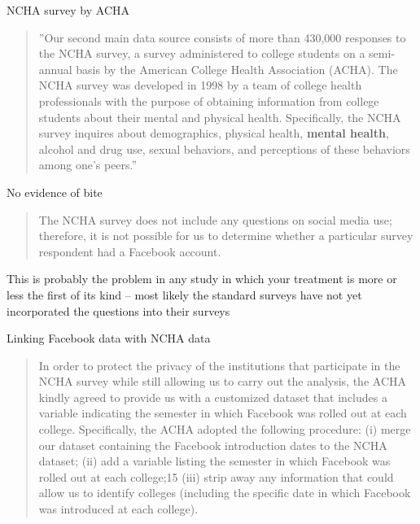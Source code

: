 \documentclass{beamer}
\begin{document}
\begin{frame}{NCHA survey by ACHA}

\begin{quote}
''Our second main data source consists of more than 430,000 responses to the NCHA survey, a survey administered to college students on a semi-annual basis by the American College Health Association (ACHA). The NCHA survey was developed in 1998 by a team of college health professionals with the purpose of obtaining information from college students about their mental and physical health. Specifically, the NCHA survey inquires about demographics, physical health, \textbf{mental health}, alcohol and drug use, sexual behaviors, and perceptions of these behaviors among one’s peers.''
\end{quote}

\end{frame}

\begin{frame}{No evidence of bite}

\begin{quote}
The NCHA survey does not include any questions on social media use; therefore, it is not possible for us to determine whether a particular survey respondent had a Facebook account.
\end{quote}

\bigskip

This is probably the problem in any study in which your treatment is more or less the first of its kind -- most likely the standard surveys have not yet incorporated the questions into their surveys

\end{frame}

\begin{frame}{Linking Facebook data with NCHA data}

\begin{quote}
In order to protect the privacy of the institutions that participate in the NCHA survey while still allowing us to carry out the analysis, the ACHA kindly agreed to provide us with a customized dataset that includes a variable indicating the semester in which Facebook was rolled out at each college. Specifically, the ACHA adopted the following procedure: (i) merge our dataset containing the Facebook introduction dates to the NCHA dataset; (ii) add a variable listing the semester in which Facebook was rolled out at each college;15 (iii) strip away any information that could allow us to identify colleges (including the specific date in which Facebook was introduced at each college).
\end{quote}

\end{frame}
\end{document}
